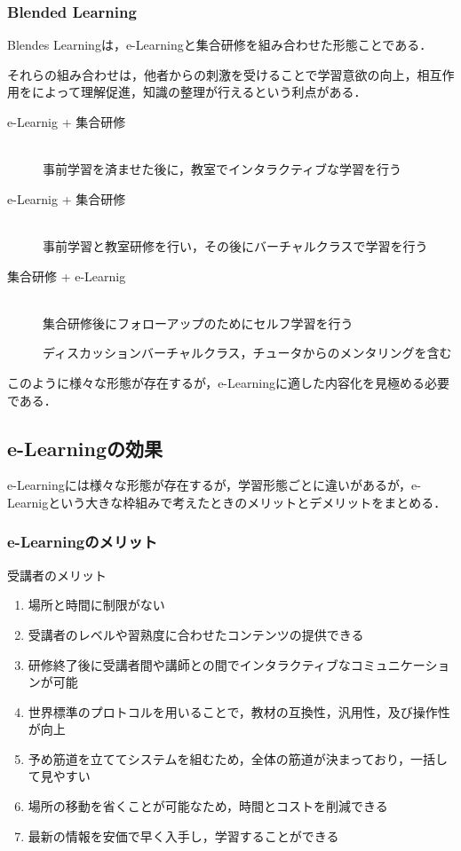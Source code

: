 \documentclass[a4j,12pt]{jsarticle}
\begin{document}
\subsubsection{Blended Learning}
Blendes Learningは，e-Learningと集合研修を組み合わせた形態ことである．

それらの組み合わせは，他者からの刺激を受けることで学習意欲の向上，相互作用をによって理解促進，知識の整理が行えるという利点がある．
\begin{description} 

\item[e-Learnig + 集合研修]\mbox{}\\ 
事前学習を済ませた後に，教室でインタラクティブな学習を行う

\item[e-Learnig + 集合研修]\mbox{}\\ 
事前学習と教室研修を行い，その後にバーチャルクラスで学習を行う

\item[集合研修 + e-Learnig]\mbox{}\\ 
集合研修後にフォローアップのためにセルフ学習を行う

ディスカッションバーチャルクラス，チュータからのメンタリングを含む
\end{description}
このように様々な形態が存在するが，e-Learningに適した内容化を見極める必要である．
\newpage

\subsection{e-Learningの効果}
e-Learningには様々な形態が存在するが，学習形態ごとに違いがあるが，e-Learnigという大きな枠組みで考えたときのメリットとデメリットをまとめる．
\subsubsection{e-Learningのメリット}
\begin{large}受講者のメリット\end{large}
\begin{enumerate}
\item 場所と時間に制限がない
\item 受講者のレベルや習熟度に合わせたコンテンツの提供できる
\item 研修終了後に受講者間や講師との間でインタラクティブなコミュニケーションが可能
\item 世界標準のプロトコルを用いることで，教材の互換性，汎用性，及び操作性が向上
\item 予め筋道を立ててシステムを組むため，全体の筋道が決まっており，一括して見やすい
\item 場所の移動を省くことが可能なため，時間とコストを削減できる
\item 最新の情報を安価で早く入手し，学習することができる
\end{enumerate}
\end{document}
